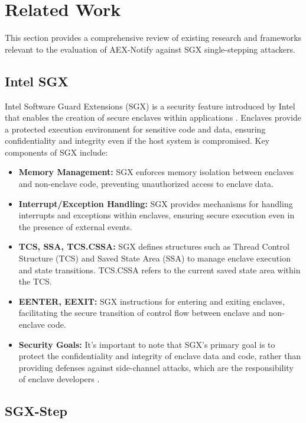 \documentclass{llncs}
\begin{document}
\section{Related Work}

This section provides a comprehensive review of existing research and frameworks relevant to the evaluation of AEX-Notify against SGX single-stepping attackers.

\subsection{Intel SGX}

Intel Software Guard Extensions (SGX) is a security feature introduced by Intel that enables the creation of secure enclaves within applications \cite{costan2016intel}. Enclaves provide a protected execution environment for sensitive code and data, ensuring confidentiality and integrity even if the host system is compromised. Key components of SGX include:

\begin{itemize}
    \item \textbf{Memory Management:} SGX enforces memory isolation between enclaves and non-enclave code, preventing unauthorized access to enclave data.
    \item \textbf{Interrupt/Exception Handling:} SGX provides mechanisms for handling interrupts and exceptions within enclaves, ensuring secure execution even in the presence of external events.
    \item \textbf{TCS, SSA, TCS.CSSA:} SGX defines structures such as Thread Control Structure (TCS) and Saved State Area (SSA) to manage enclave execution and state transitions. TCS.CSSA refers to the current saved state area within the TCS.
    \item \textbf{EENTER, EEXIT:} SGX instructions for entering and exiting enclaves, facilitating the secure transition of control flow between enclave and non-enclave code.
    \item \textbf{Security Goals:} It's important to note that SGX's primary goal is to protect the confidentiality and integrity of enclave data and code, rather than providing defenses against side-channel attacks, which are the responsibility of enclave developers \cite{costan2016intel}.
\end{itemize}

\subsection{SGX-Step}
\end{document}
